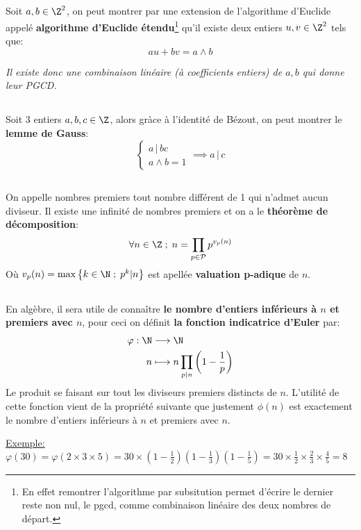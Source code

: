 \subsection*{}
Soit \(a, b\in \Z^2\), on peut montrer par une extension de l'algorithme d'Euclide appelé \textbf{algorithme d'Euclide étendu}\footnote[1]{En effet remontrer l'algorithme par subsitution permet d'écrire le dernier reste non nul, le pgcd, comme combinaison linéaire des deux nombres de départ.} qu'il existe deux entiers \(u, v \in \Z^2\) tels que:
\[
      au + bv = a \wedge b
\]
\begin{center}
   \textit{
       Il existe donc une combinaison linéaire (à coefficients entiers) de \(a, b\) qui donne leur PGCD.
   }
\end{center}
\pagebreak

\subsection*{}
Soit 3 entiers \(a, b, c \in \Z\), alors gràce à l'identité de Bézout, on peut montrer le \textbf{lemme de Gauss}:
\[
    \begin{cases} 
        a \, | \, bc \\
        a \wedge b = 1
    \end{cases} \implies a \, | \, c
\]

\subsection*{}
On appelle nombres premiers tout nombre différent de 1 qui n'admet aucun diviseur. Il existe une infinité de nombres premiers et on a le \textbf{théorème de décomposition}:
\[ 
   \forall n \in \Z \; ; \; n = \prod_{p \in \mathcal{P}} p^{v_{p}(n)} 
\]
Où \( v_p(n) = \max \left\{ k \in \N \; ; \; p^k | n \right\}  \) est apellée \textbf{valuation p-adique} de \( n \).

\subsection*{}
En algèbre, il sera utile de connaître \textbf{le nombre d'entiers inférieurs à \(n\) et premiers avec \(n\)}, pour ceci on définit \textbf{la fonction indicatrice d'Euler} par:
\[
   \begin{aligned}
      \varphi: \N &\longrightarrow \N\\
      n &\longmapsto n \prod_{p|n}{\left(1-\frac{1}{p}\right)}
   \end{aligned}
\]
Le produit se faisant sur tout les diviseurs premiers distincts de \(n\). L'utilité de cette fonction vient de la propriété suivante que justement \( \phi(n) \) est exactement le nombre d'entiers inférieurs à \( n \) et premiers avec \( n \).\<

\underline{Exemple:} \(\varphi(30) = \varphi(2\times3\times5) = 30\times\left(1-\frac{1}{2}\right)\left(1-\frac{1}{3}\right)\left(1-\frac{1}{5}\right) = 30\times\frac{1}{2}\times\frac{2}{3}\times\frac{4}{5} = 8\)
